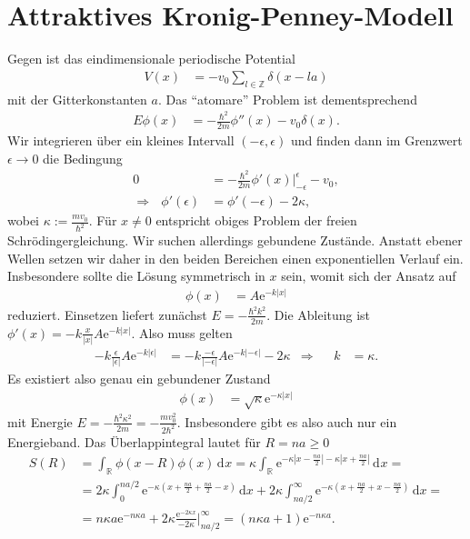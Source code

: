 \documentclass[english, parskip=full]{scrartcl}
\newcommand{\intx}{}
\newcommand{\kla}{}
\newcommand{\e}{\text{e}}
\begin{document}
\section{Attraktives Kronig-Penney-Modell}
Gegen ist das eindimensionale periodische Potential
\begin{align}
V(x) &= -v_0\sum_{l\in\mathbb{Z}} \delta(x-la)
\end{align}
mit der Gitterkonstanten $a$.
Das ``atomare'' Problem ist dementsprechend
\begin{align}
E\phi(x) &= -\frac{\hbar^2}{2m}\phi''(x) - v_0\delta(x).
\end{align}
Wir integrieren über ein kleines Intervall $(-\epsilon,\epsilon)$ und finden dann im Grenzwert $\epsilon\rightarrow 0$ die Bedingung
\begin{align}
0 &= -\frac{\hbar^2}{2m}\phi'(x) \Big\vert_{-\epsilon}^\epsilon - v_0,\\
\Rightarrow\ \ \ \phi'(\epsilon) &= \phi'(-\epsilon) - 2\kappa,
\end{align}
wobei $\kappa := \frac{mv_0}{\hbar^2}$.
Für $x\neq 0$ entspricht obiges Problem der freien Schrödingergleichung.
Wir suchen allerdings gebundene Zustände.
Anstatt ebener Wellen setzen wir daher in den beiden Bereichen einen exponentiellen Verlauf ein.
Insbesondere sollte die Lösung symmetrisch in $x$ sein, womit sich der Ansatz auf
\begin{align}
\phi(x) &= A\e^{-k|x|}
\end{align} 
reduziert.
Einsetzen liefert zunächst $E = -\frac{\hbar^2k^2}{2m}$.
Die Ableitung ist $\phi'(x) = -k \frac{x}{|x|}  A\e^{-k|x|}$.
Also muss gelten
\begin{align}
-k\frac{\epsilon}{|\epsilon|} A\e^{-k|\epsilon|} &= -k\frac{-\epsilon}{|-\epsilon|} A\e^{-k|-\epsilon|} - 2\kappa &\Rightarrow && k &= \kappa.
\end{align}
Es existiert also genau ein gebundener Zustand 
\begin{align}
\phi(x) &= \sqrt{\kappa}\e^{-\kappa|x|}
\end{align}
mit Energie $E=-\frac{\hbar^2\kappa^2}{2m} = -\frac{mv_0^2}{2\hbar^2}$.
Insbesondere gibt es also auch nur ein Energieband.
Das Überlappintegral lautet für $R=na\ge 0$
\begin{align}
S(R) &= \int_{\mathbb{R}^{ }} \phi(x-R)\phi(x) \, \mathrm{d}^{ }x = \kappa \int_{\mathbb{R}^{ }} \e^{-\kappa \left\vert x - \frac{na}{2} \right\vert - \kappa \left\vert x + \frac{na}{2} \right\vert} \, \mathrm{d}^{ }x = \\
&= 2\kappa \int_{0}^{na/2} \e^{-\kappa \kla\left( x + \frac{na}{2} + \frac{na}{2} - x \right)}\, \mathrm{d}x + 2\kappa\intx\int_{na/2}^{\infty} \e^{-\kappa \kla\left( x + \frac{na}{2} + x - \frac{na}{2} \right)}\, \mathrm{d}x = \\
&= n\kappa a\e^{-n\kappa a} + 2\kappa \frac{\e^{-2\kappa x}}{-2\kappa}\bigg\vert_{na/2}^\infty = (n\kappa a+1)\e^{-n\kappa a}.
\end{align}
\end{document}
